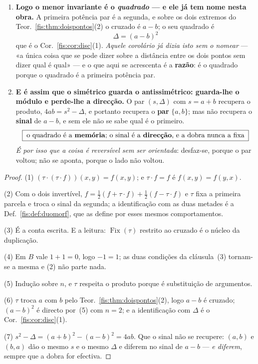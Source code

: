 \documentclass[livro.tex]{subfiles}
\begin{document}
\begin{teorema}
\begin{enumerate}
\item[(6)] \textbf{Logo o menor invariante é o \emph{quadrado} --- e ele já tem
nome nesta obra.} A primeira potência par é a segunda, e sobre os dois extremos
do Teor.~\ref{fis:thm:doispontos}(2) o cruzado é $a-b$; o seu quadrado é
\[
\boxed{\;\Delta=(a-b)^{2}\;}
\]
que é o Cor.~\ref{fis:cor:disc}(1). \emph{Aquele corolário já dizia isto sem o
nomear} --- «a única coisa que se pode dizer sobre a distância entre os dois
pontos sem dizer qual é qual» --- e o que aqui se acrescenta é a \textbf{razão}:
é o quadrado porque o quadrado é a primeira potência par.
\item[(7)] \textbf{E é assim que o simétrico guarda o antissimétrico: guarda-lhe
o módulo e perde-lhe a direcção.} O par $(s,\Delta)$ com $s=a+b$ recupera o
produto, $4ab=s^{2}-\Delta$, e portanto recupera o \textbf{par} $\{a,b\}$; mas
não recupera o \textbf{sinal} de $a-b$, e sem ele não se sabe qual é o primeiro.
\[
\boxed{\;\text{o quadrado é a \textbf{memória}; o sinal é a \textbf{direcção}, e a dobra nunca a fixa}\;}
\]
\emph{É por isso que a coisa é reversível sem ser orientada}: desfaz-se, porque o
par voltou; não se aponta, porque o lado não voltou.
\end{enumerate}
\end{teorema}

\begin{proof}
(1) $(\tau\!\cdot\!(\tau\!\cdot\! f))(x,y)=f(x,y)$; e $\tau\!\cdot\! f=f$ é
$f(x,y)=f(y,x)$.

(2) Com o dois invertível, $f=\tfrac12(f+\tau\!\cdot\! f)+\tfrac12(f-\tau\!\cdot\! f)$
e $\tau$ fixa a primeira parcela e troca o sinal da segunda; a identificação com
as duas metades é a Def.~\ref{fis:def:duomorf}, que as define por esses mesmos
comportamentos.

(3) É a conta escrita. E a leitura: $\operatorname{Fix}(\tau)$ restrito ao
cruzado é o núcleo da duplicação.

(4) Em $B$ vale $1+1=0$, logo $-1=1$; as duas condições da cláusula~(3) tornam-se
a mesma e (2) não parte nada.

(5) Indução sobre $n$, e $\tau$ respeita o produto porque é substituição de
argumentos.

(6) $\tau$ troca $a$ com $b$ pelo Teor.~\ref{fis:thm:doispontos}(2), logo $a-b$ é
cruzado; $(a-b)^{2}$ é directo por~(5) com $n=2$; e a identificação com $\Delta$
é o Cor.~\ref{fis:cor:disc}(1).

(7) $s^{2}-\Delta=(a+b)^{2}-(a-b)^{2}=4ab$. Que o sinal não se recupere: $(a,b)$
e $(b,a)$ dão o mesmo $s$ e o mesmo $\Delta$ e diferem no sinal de $a-b$ ---
\emph{e diferem}, sempre que a dobra for efectiva.
\end{proof}
\end{document}
